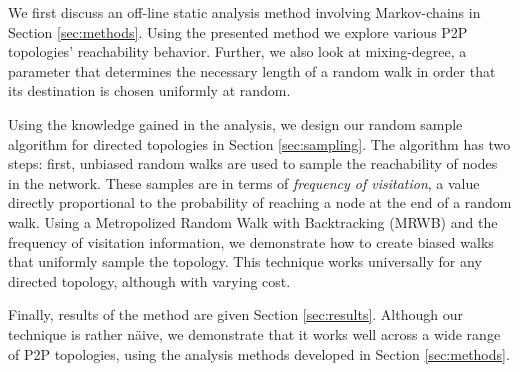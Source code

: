 We first discuss an off-line static analysis method involving Markov-chains in
Section \ref{sec:methods}.  Using the presented method we explore various P2P
topologies' reachability behavior.  Further, we also look at mixing-degree, a
parameter that determines the necessary length of a random walk in order that
its destination is chosen uniformly at random. 

Using the knowledge gained in the analysis, we design our random sample
algorithm for directed topologies in Section \ref{sec:sampling}.  The algorithm
has two steps: first, unbiased random walks are used to sample the reachability
of nodes in the network.  These samples are in terms of \emph{frequency of
visitation}, a value directly proportional to the probability of reaching a
node at the end of a random walk.  Using a Metropolized Random Walk with
Backtracking (MRWB) \cite{stutzberg:imc06} and the frequency of visitation
information, we demonstrate how to create biased walks that uniformly sample
the topology.  This technique works universally for any directed topology,
although with varying cost.

Finally, results of the method are given Section \ref{sec:results}.  Although
our technique is rather n\"{a}ive, we demonstrate that it works well across a
wide range of P2P topologies, using the analysis methods developed in Section
\ref{sec:methods}.

